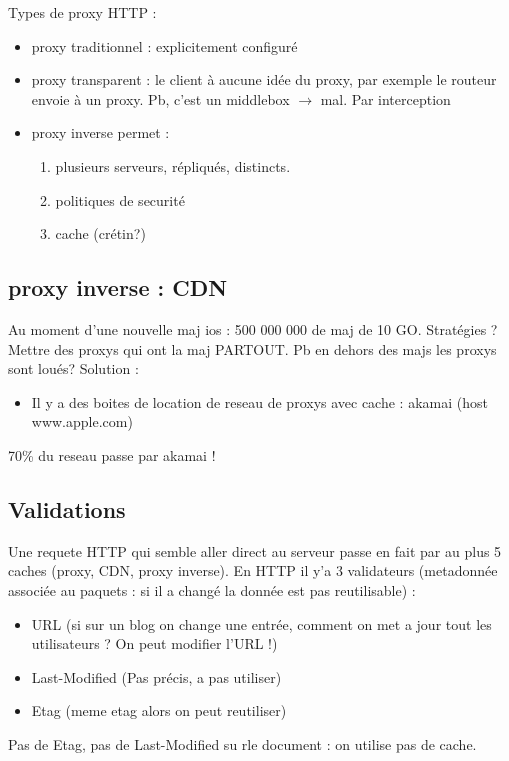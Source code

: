 \documentclass[12pt]{article}
\theoremstyle{plain}
\theoremstyle{definition}
\theoremstyle{remark}
\begin{document}
Types de proxy HTTP :
\begin{itemize}
    \item proxy traditionnel : explicitement configuré
    \item proxy transparent : le client à aucune idée du proxy, par exemple le routeur envoie à un proxy. Pb, c'est un middlebox
    $\rightarrow$ mal. Par interception
    \item proxy inverse permet : \begin{enumerate}
        \item plusieurs serveurs, répliqués, distincts.
        \item politiques de securité
        \item cache (crétin?)
    \end{enumerate}
\end{itemize}


\subsection{proxy inverse : CDN}
Au moment d'une nouvelle maj ios : 500 000 000 de maj de 10 GO. Stratégies ? Mettre des proxys qui ont la maj PARTOUT.
Pb en dehors des majs les proxys sont loués? Solution :
\begin{itemize}
    \item  Il y a des boites de location de reseau de proxys avec cache : akamai (host www.apple.com)
\end{itemize} 
70\% du reseau passe par akamai !

\subsection{Validations}
Une requete HTTP qui semble aller direct au serveur passe en fait par au plus 5 caches (proxy, CDN, proxy inverse).
En HTTP il y'a 3 validateurs (metadonnée associée au paquets : si il a changé la donnée est pas reutilisable) :
\begin{itemize}
    \item URL (si sur un blog on change une entrée, comment on met a jour tout les utilisateurs ? On peut modifier l'URL !)
    \item Last-Modified (Pas précis, a pas utiliser)
    \item Etag (meme etag alors on peut reutiliser)
\end{itemize}
Pas de Etag, pas de Last-Modified su rle document : on utilise pas de cache.
\end{document}
